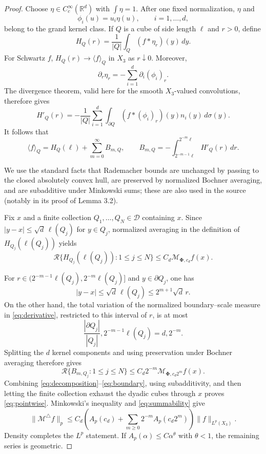 \documentclass[11pt]{article}
\newcommand{\Rbd}{\mathcal R}
\newcommand{\M}{\mathcal M}
\newcommand{\PhiClass}{\boldsymbol\Phi}
\begin{document}
\begin{proof}
Choose $\eta\in C_c^\infty(\mathbb R^d)$ with $\int\eta=1$.  After one
fixed normalization, $\eta$ and
\[
 \phi_i(u)=u_i\eta(u),\qquad i=1,\ldots,d,
\]
belong to the grand kernel class.  If $Q$ is a cube of side length $\ell$
and $r>0$, define
\[
 H_Q(r)=\frac1{|Q|}\int_Q(f*\eta_r)(y)\,dy.
\]
For Schwartz $f$, $H_Q(r)\to\langle f\rangle_Q$ in $X_3$ as $r\downarrow0$.
Moreover,
\[
 \partial_r\eta_r=-\sum_{i=1}^d\partial_i(\phi_i)_r.
\]
The divergence theorem, valid here for the smooth $X_3$-valued convolutions,
therefore gives
\begin{equation}\label{eq:derivative}
 H'_Q(r)=-\frac1{|Q|}\sum_{i=1}^d
 \int_{\partial Q}(f*(\phi_i)_r)(y)n_i(y)\,d\sigma(y).
\end{equation}
It follows that
\begin{equation}\label{eq:decomposition}
 \langle f\rangle_Q=H_Q(\ell)+\sum_{m=0}^{\infty}B_{m,Q},
 \qquad
 B_{m,Q}=-\int_{2^{-m-1}\ell}^{2^{-m}\ell}H'_Q(r)\,dr.
\end{equation}

We use the standard facts that Rademacher bounds are unchanged by passing to
the closed absolutely convex hull, are preserved by normalized Bochner
averaging, and are subadditive under Minkowski sums; these are also used in
the source (notably in its proof of Lemma 3.2).

Fix $x$ and a finite collection $Q_1,\ldots,Q_N\in\mathcal D$ containing
$x$.  Since $|y-x|\leq\sqrt d\,\ell(Q_j)$ for $y\in Q_j$, normalized
averaging in the definition of $H_{Q_j}(\ell(Q_j))$ yields
\begin{equation}\label{eq:mainterm}
 \Rbd\{H_{Q_j}(\ell(Q_j)):1\leq j\leq N\}
 \leq C_d\M_{\PhiClass,c_d}f(x).
\end{equation}

For $r\in(2^{-m-1}\ell(Q_j),2^{-m}\ell(Q_j)]$ and
$y\in\partial Q_j$, one has
\[
 |y-x|\leq\sqrt d\,\ell(Q_j)\leq 2^{m+1}\sqrt d\,r.
\]
On the other hand, the total variation of the normalized boundary--scale
measure in \eqref{eq:derivative}, restricted to this interval of $r$, is at
most
\[
 \frac{|\partial Q_j|}{|Q_j|},2^{-m-1}\ell(Q_j)
 =d,2^{-m}.
\]
Splitting the $d$ kernel components and using preservation under Bochner
averaging therefore gives
\begin{equation}\label{eq:boundary}
 \Rbd\{B_{m,Q_j}:1\leq j\leq N\}
 \leq C_d2^{-m}\M_{\PhiClass,c_d2^m}f(x).
\end{equation}
Combining \eqref{eq:decomposition}--\eqref{eq:boundary}, using subadditivity,
and then letting the finite collection exhaust the dyadic cubes through $x$
proves \eqref{eq:pointwise}.  Minkowski's inequality and
\eqref{eq:summability} give
\[
 \|\M^\triangle f\|_p
 \leq C_d\left(A_p(c_d)+\sum_{m\geq0}2^{-m}A_p(c_d2^m)\right)
 \|f\|_{L^p(X_3)}.
\]
Density completes the $L^p$ statement.  If $A_p(\alpha)\leq C\alpha^\theta$
with $\theta<1$, the remaining series is geometric.
\end{proof}
\end{document}
